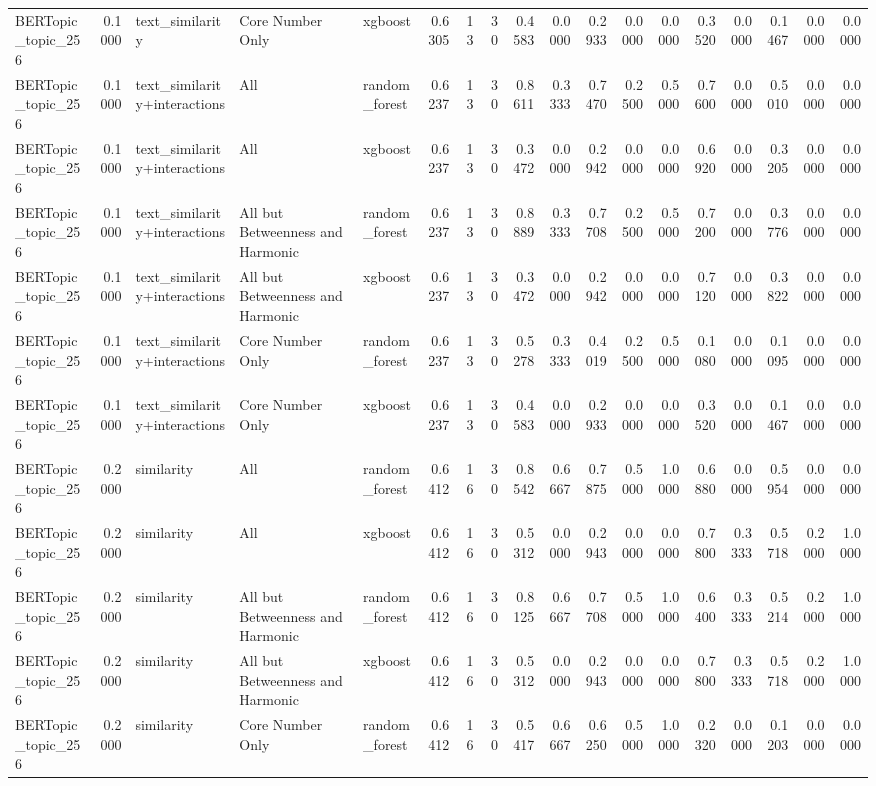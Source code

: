 \begin{tabular}{lrlllrrrrrrrrrrrrr}
BERTopic_topic_256 & 0.1000 & text_similarity & Core Number Only & xgboost & 0.6305 & 13 & 30 & 0.4583 & 0.0000 & 0.2933 & 0.0000 & 0.0000 & 0.3520 & 0.0000 & 0.1467 & 0.0000 & 0.0000 \\
BERTopic_topic_256 & 0.1000 & text_similarity+interactions & All & random_forest & 0.6237 & 13 & 30 & 0.8611 & 0.3333 & 0.7470 & 0.2500 & 0.5000 & 0.7600 & 0.0000 & 0.5010 & 0.0000 & 0.0000 \\
BERTopic_topic_256 & 0.1000 & text_similarity+interactions & All & xgboost & 0.6237 & 13 & 30 & 0.3472 & 0.0000 & 0.2942 & 0.0000 & 0.0000 & 0.6920 & 0.0000 & 0.3205 & 0.0000 & 0.0000 \\
BERTopic_topic_256 & 0.1000 & text_similarity+interactions & All but Betweenness and Harmonic & random_forest & 0.6237 & 13 & 30 & 0.8889 & 0.3333 & 0.7708 & 0.2500 & 0.5000 & 0.7200 & 0.0000 & 0.3776 & 0.0000 & 0.0000 \\
BERTopic_topic_256 & 0.1000 & text_similarity+interactions & All but Betweenness and Harmonic & xgboost & 0.6237 & 13 & 30 & 0.3472 & 0.0000 & 0.2942 & 0.0000 & 0.0000 & 0.7120 & 0.0000 & 0.3822 & 0.0000 & 0.0000 \\
BERTopic_topic_256 & 0.1000 & text_similarity+interactions & Core Number Only & random_forest & 0.6237 & 13 & 30 & 0.5278 & 0.3333 & 0.4019 & 0.2500 & 0.5000 & 0.1080 & 0.0000 & 0.1095 & 0.0000 & 0.0000 \\
BERTopic_topic_256 & 0.1000 & text_similarity+interactions & Core Number Only & xgboost & 0.6237 & 13 & 30 & 0.4583 & 0.0000 & 0.2933 & 0.0000 & 0.0000 & 0.3520 & 0.0000 & 0.1467 & 0.0000 & 0.0000 \\
BERTopic_topic_256 & 0.2000 & similarity & All & random_forest & 0.6412 & 16 & 30 & 0.8542 & 0.6667 & 0.7875 & 0.5000 & 1.0000 & 0.6880 & 0.0000 & 0.5954 & 0.0000 & 0.0000 \\
BERTopic_topic_256 & 0.2000 & similarity & All & xgboost & 0.6412 & 16 & 30 & 0.5312 & 0.0000 & 0.2943 & 0.0000 & 0.0000 & 0.7800 & 0.3333 & 0.5718 & 0.2000 & 1.0000 \\
BERTopic_topic_256 & 0.2000 & similarity & All but Betweenness and Harmonic & random_forest & 0.6412 & 16 & 30 & 0.8125 & 0.6667 & 0.7708 & 0.5000 & 1.0000 & 0.6400 & 0.3333 & 0.5214 & 0.2000 & 1.0000 \\
BERTopic_topic_256 & 0.2000 & similarity & All but Betweenness and Harmonic & xgboost & 0.6412 & 16 & 30 & 0.5312 & 0.0000 & 0.2943 & 0.0000 & 0.0000 & 0.7800 & 0.3333 & 0.5718 & 0.2000 & 1.0000 \\
BERTopic_topic_256 & 0.2000 & similarity & Core Number Only & random_forest & 0.6412 & 16 & 30 & 0.5417 & 0.6667 & 0.6250 & 0.5000 & 1.0000 & 0.2320 & 0.0000 & 0.1203 & 0.0000 & 0.0000 \\

\end{tabular}
